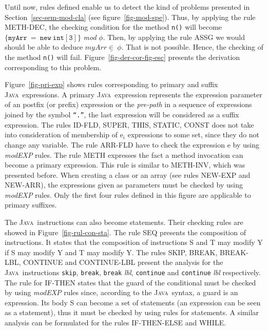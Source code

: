 \documentclass[a4paper]{llncs}
\newcommand{\java}{\textsc{Java}}
\begin{document}
Until now, rules defined enable us to detect the kind of problems
presented in Section~\ref{sec-sem-mod-cla} (see
figure~\ref{fig-mod-spe}). Thus, by applying the rule
\textup{METH-DEC}, the checking condition for the method \texttt{n()}
will become $\mathtt{\{myArr\ =\ new\ int[3]\}}$ \textit{mod}
$\phi$. Then,
by applying the rule \textup{ASSG} we would should be able to
deduce $myArr\underline\in\ \phi$. That is not possible. Hence, the
checking
of the method \texttt{n()} will fail. Figure~\ref{fig-der-cor-fig-esc}
presents the derivation corresponding to this problem.

Figure~\ref{fig-pri-exp} shows rules corresponding to
primary and suffix \java~expressions. A primary \java~expression
represents the expression parameter of an postfix (or prefix)
expression
or the \emph{pre-path} in a sequence of expressions joined by the
symbol \texttt{``.''}, the 
last expression will be considered as a suffix expression. The rules
\textup{ID-FLD}, \textup{SUPER}, \textup{THIS}, \textup{STATIC},
\textup{CONST} does not take into consideration of membership of
\textup{e}$_i$ expressions to some set,
since they do not change any variable. The rule \textup{ARR-FLD} have
to check the expression \textup{e} by using \textit{modEXP}
rules. The rule \textup{METH} expresses the fact a method invocation
can become a primary expression. This rule is similar to
\textup{METH-INV}, which was presented before. When creating a class
or an array (see rules \textup{NEW-EXP} and \textup{NEW-ARR}), the
expressions given as parameters must be checked by using \textit{modEXP}
rules. Only the first four rules defined in this figure are applicable
to primary suffixes. %

The \java~instructions can also become statements. Their checking
rules are showed in Figure~\ref{fig-rul-con-sta}. The rule
\textup{SEQ} presents the composition of instructions. It states that
the composition of instructions \textup{S} and \textup{T} may modify
\textsc{Y} if \textup{S} may modify \textsc{Y} and \textup{T} may
modify \textsc{Y}. The rules \textup{SKIP}, \textup{BREAK},
\textup{BREAK-LBL}, \textup{CONTINUE} and \textup{CONTINUE-LBL}
present the analysis for the \java~instructions \texttt{skip},
\texttt{break}, \texttt{break} \emph{lbl}, \texttt{continue} and
\texttt{continue} \emph{lbl} respectively. The rule for
\textup{IF-THEN} states that the guard of the conditional must be
checked by using
\textit{modEXP} rules since, according to the \java~syntax, a guard is
an expression. Its body \textsc{S} can become a set of statements (an
expression can be seen as a statement), thus it must be checked by
using rules for statements. A similar analysis can be formulated for the
rules \textup{IF-THEN-ELSE} and \textup{WHILE}. %
\end{document}
